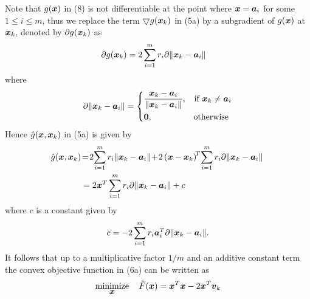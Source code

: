 Note that $g(\mbox{\boldmath$x$})$ in (8) is not differentiable at the point where $\mbox{\boldmath$x$} = \mbox{\boldmath$a$}_i$ for some $1 \leq i \leq m$, thus we replace the term $\bigtriangledown g(\mbox{\boldmath$x$}_k)$ in (5a) by a subgradient \cite{Nes} of $g(\mbox{\boldmath$x$})$ at $\mbox{\boldmath$x$}_k$, denoted by $\partial g(\mbox{\boldmath$x$}_k)$ as
\begin{equation} %
\nonumber
\begin{aligned}
\partial g{(\Bx_k)} & = 2 \sum^m_{i = 1} r_i \partial \|\Bx_k - \Ba_i\| 
\end{aligned}
\end{equation}
where
\begin{equation}
\nonumber
\partial \|\Bx_k - \Ba_i\|  = \left\{
	\begin{aligned}
	& \frac{\Bx_k - \Ba_i}{\|\Bx_k - \Ba_i\|}, &\mbox{if } \Bx_k \neq \Ba_i \\
	& \BO, &\mbox{otherwise }%
	\end{aligned}
\right.
\end{equation}
Hence  $\hat{g}(\mbox{\boldmath$x$}, \mbox{\boldmath$x$}_k)$ in (5a) is given by
\begin{equation} %
\nonumber
\begin{aligned}
\! \hat{g}(\Bx, \Bx_k)&\! =  \! 2\! \sum^m_{i=1} r_i \|\Bx_k - \Ba_i\| \!  + \! 2 \left( \Bx - \Bx_k \right)^{\!T}\! \sum^m_{i=1} r_i \partial \|\Bx_k - \Ba_i\| \\
& = 2\Bx^T \sum^m_{i=1} r_i \partial \|\Bx_k - \Ba_i \| + c
 \end{aligned}
\end{equation}
where $c$ is a constant given by 
\begin{equation}
\nonumber
c = -2 \sum_{i = 1}^m r_i \mbox{\boldmath$a$}_i^T \partial \|\mbox{\boldmath$x$}_k - \mbox{\boldmath$a$}_i\|.
\end{equation}
It follows that up to a multiplicative factor $1/m$ and an additive constant term the convex objective function in (6a) can  be written as 
\begin{equation} %
\Min_{\Bx} \quad \hat{F}(\Bx) = \Bx^T\Bx - 2\Bx^T {\Bv}_k
\end{equation}
